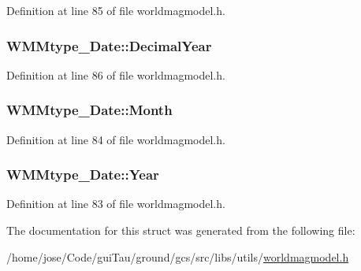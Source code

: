 Definition at line 85 of file worldmagmodel.\-h.

\hypertarget{struct_w_m_mtype___date_a66b662f919345a2e81889ef080947ec1}{
\subsubsection[{Decimal\-Year}]{ W\-M\-Mtype\-\_\-\-Date\-::\-Decimal\-Year}}\label{struct_w_m_mtype___date_a66b662f919345a2e81889ef080947ec1}


Definition at line 86 of file worldmagmodel.\-h.

\hypertarget{struct_w_m_mtype___date_a8c47663c3abf7deaf85b9f7630d51738}{
\subsubsection[{Month}]{ W\-M\-Mtype\-\_\-\-Date\-::\-Month}}\label{struct_w_m_mtype___date_a8c47663c3abf7deaf85b9f7630d51738}


Definition at line 84 of file worldmagmodel.\-h.

\hypertarget{struct_w_m_mtype___date_a6a93268d51911bf52e36f3096b1c263f}{
\subsubsection[{Year}]{ W\-M\-Mtype\-\_\-\-Date\-::\-Year}}\label{struct_w_m_mtype___date_a6a93268d51911bf52e36f3096b1c263f}


Definition at line 83 of file worldmagmodel.\-h.



The documentation for this struct was generated from the following file\-:\begin{DoxyCompactItemize}
\item 
/home/jose/\-Code/gui\-Tau/ground/gcs/src/libs/utils/\hyperlink{worldmagmodel_8h}{worldmagmodel.\-h}\end{DoxyCompactItemize}
